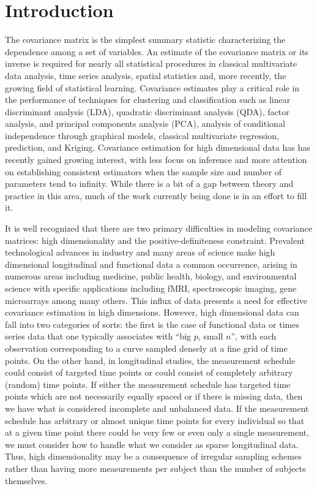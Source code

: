

\chapter{Introduction}

\indent

The covariance matrix is the simplest summary statistic characterizing the dependence among a set of variables. An estimate of the covariance matrix or its inverse is required for nearly all statistical procedures in classical multivariate data analysis, time series analysis, spatial statistics and, more recently, the growing field of statistical learning. Covariance estimates play a critical role in the performance of techniques for clustering and classification such as linear discriminant analysis (LDA), quadratic discriminant analysis (QDA), factor analysis, and principal components analysis (PCA), analysis of conditional independence through graphical models, classical multivariate regression, prediction, and Kriging. Covariance estimation for high dimensional data has has recently gained growing interest, with less focus on inference and more attention on establishing consistent estimators when the sample size and number of parameters tend to infinity. While there is a bit of a gap between theory and practice in this area, much of the work currently being done is in an effort to fill it. 

\bigskip

It is well recognized that there are two primary difficulties in modeling covariance matrices: high dimensionality and the positive-definiteness constraint. Prevalent technological advances in industry and many areas of science make high dimensional longitudinal and functional data a common occurrence, arising in numerous areas including medicine, public health, biology, and environmental science with specific applications including fMRI, spectroscopic imaging, gene microarrays among many others. This influx of data presents a need for effective covariance estimation in high dimensions. However, high dimensional data can fall into two categories of sorts: the first is the case of functional data or times series data that one typically associates with ``big $p$, small $n$'', with each observation corresponding to a curve sampled densely at a fine grid of time points. On the other hand, in longitudinal studies, the measurement schedule could consist of targeted time points or could consist of completely arbitrary (random) time points. If either the measurement schedule has targeted time points which are not necessarily equally spaced or if there is missing data, then we have what is considered incomplete and unbalanced data. If the measurement schedule has arbitrary or almost unique time points for every individual so that at a given time point there could be very few or even only a single measurement, we must consider how to handle what we consider as sparse longitudinal data. Thus, high dimensionality may be a consequence of irregular sampling schemes rather than having more measurements per subject than the number of subjects themselves. 

